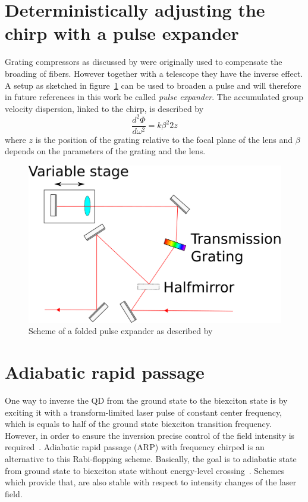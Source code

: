 \section{Deterministically adjusting the chirp with a pulse expander}

Grating compressors as discussed by \textcite{martinez_3000_1987} were originally used to compensate the broading of fibers.
However together with a telescope they have the inverse effect.
A setup as sketched in figure~\ref{fig:pulse-expander} can be used to broaden a pulse and will therefore in future references in this work be called \textit{pulse expander}.
The accumulated group velocity dispersion, linked to the chirp, is described by
\begin{equation}
\frac{d^2 \Phi}{d \omega^2} = k \beta^2 2 z
\end{equation}
where $z$ is the position of the grating relative to the focal plane of the lens and $\beta$ depends on the parameters of the grating and the lens.

\begin{figure}[H]
	\centering
	\includegraphics[width=0.7\linewidth]{figures/chirp/pulse-expander}
	\caption{Scheme of a folded pulse expander as described by \textcite{martinez_3000_1987}}
	\label{fig:pulse-expander}
\end{figure}

\section{Adiabatic rapid passage}
One way to inverse the \ac{QD} from the ground state to the biexciton state is by exciting it with a transform-limited laser pulse of constant center frequency, which is equals to half of the ground state biexciton transition frequency.
However, in order to ensure the inversion precise control of the field intensity is required~\cite{glassl_biexciton_2013}.
Adiabatic rapid passage  (\acs{ARP}) with frequency chirped is an alternative to this Rabi-flopping scheme.
Basically, the goal is to adiabatic state from ground state to biexciton state without energy-level crossing~\cite{hui_proposal_2008}.
Schemes which provide that, are also stable with respect to intensity changes of the laser field.

